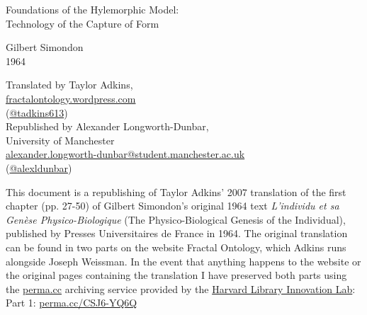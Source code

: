 \documentclass[a4paper]{article}
\begin{document}

\Large
\begin{center}
Foundations of the Hylemorphic Model:\\
Technology of the Capture of Form\\

\hspace{10pt}

\large
Gilbert Simondon\\
\large
1964\\

\hspace{10pt}

\small
Translated by Taylor Adkins,\\
\href{https://fractalontology.wordpress.com}{fractalontology.wordpress.com}\\
(\href{https://twitter.com/tadkins613}{@tadkins613})\\
[1\baselineskip]
Republished by Alexander Longworth-Dunbar,\\
University of Manchester\\
\href{mailto:alexander.longworth-dunbar@student.manchester.ac.uk}{alexander.longworth-dunbar@student.manchester.ac.uk}\\
(\href{https:\\twitter.com/@alexldunbar}{@alexldunbar})


\end{center}

\hspace{10pt}

\normalsize

This document is a republishing of Taylor Adkins' 2007 translation of the first chapter (pp. 27-50) of Gilbert Simondon's original 1964 text \textit{L’individu et sa Genèse Physico-Biologique} (The Physico-Biological Genesis of the Individual), published by Presses Universitaires de France in 1964. The original translation can be found in two parts on the website Fractal Ontology, which Adkins runs alongside Joseph Weissman. In the event that anything happens to the website or the original pages containing the translation I have preserved both parts using the \href{https://perma.cc}{perma.cc} archiving service provided by the \href{http://lil.law.harvard.edu/}{Harvard Library Innovation Lab}:\\

Part 1: \href{https://perma.cc/CSJ6-YQ6Q}{perma.cc/CSJ6-YQ6Q}
\end{document}
